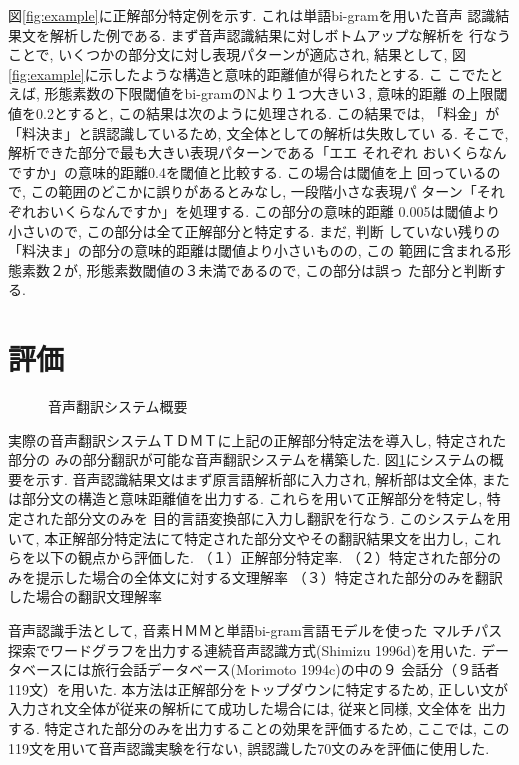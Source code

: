図\ref{fig:example}に正解部分特定例を示す. これは単語bi-gramを用いた音声
認識結果文を解析した例である. まず音声認識結果に対しボトムアップな解析を
行なうことで, いくつかの部分文に対し表現パターンが適応され, 結果として, 
図\ref{fig:example}に示したような構造と意味的距離値が得られたとする. こ
こでたとえば, 形態素数の下限閾値をbi-gramのNより１つ大きい３, 意味的距離
の上限閾値を0.2とすると, この結果は次のように処理される. この結果では, 
「料金」が「料決ま」と誤認識しているため, 文全体としての解析は失敗してい
る. そこで, 解析できた部分で最も大きい表現パターンである「エエ それぞれ
おいくらなんですか」の意味的距離0.4を閾値と比較する. この場合は閾値を上
回っているので, この範囲のどこかに誤りがあるとみなし, 一段階小さな表現パ
ターン「それぞれおいくらなんですか」を処理する. この部分の意味的距離
0.005は閾値より小さいので, この部分は全て正解部分と特定する. まだ, 判断
していない残りの「料決ま」の部分の意味的距離は閾値より小さいものの, この
範囲に含まれる形態素数２が, 形態素数閾値の３未満であるので, この部分は誤っ
た部分と判断する. 

\section{評価}

\begin{figure}
 \begin{center}
\hspace{10mm} 
 \end{center}
 \caption{音声翻訳システム概要}
 \label{fig:struct}
\vspace{-2mm}
\end{figure}

実際の音声翻訳システムＴＤＭＴに上記の正解部分特定法を導入し, 特定された部分の
みの部分翻訳が可能な音声翻訳システムを構築した. 図\ref{fig:struct}にシステムの概要を示す. 
音声認識結果文はまず原言語解析部に入力され, 解析部は文全体, または部分文の構造と意味距離値を出力する. これらを用いて正解部分を特定し, 特定された部分文のみを
目的言語変換部に入力し翻訳を行なう. 
このシステムを用いて, 本正解部分特定法にて特定された部分文やその翻訳結果文を出力し, これらを以下の観点から評価した. 
（１）正解部分特定率. 
（２）特定された部分のみを提示した場合の全体文に対する文理解率
（３）特定された部分のみを翻訳した場合の翻訳文理解率

音声認識手法として, 音素ＨＭＭと単語bi-gram言語モデルを使った
マルチパス探索でワードグラフを出力する連続音声認識方式(Shimizu 1996d)を用いた. 
データベースには旅行会話データベース(Morimoto 1994c)の中の９
会話分（９話者119文）を用いた. 
本方法は正解部分をトップダウンに特定するため, 
正しい文が入力され文全体が従来の解析にて成功した場合には, 従来と同様, 文全体を
出力する. 
特定された部分のみを出力することの効果を評価するため, ここでは, この119文を用いて音声認識実験を行ない, 誤認識した70文のみを評価に使用した. 

